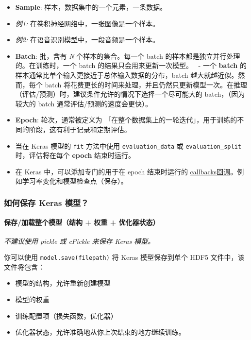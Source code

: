 \begin{itemize}
\tightlist
\item
  \textbf{Sample}: 样本，数据集中的一个元素，一条数据。
\item
  \emph{例1:} 在卷积神经网络中，一张图像是一个样本。
\item
  \emph{例2:} 在语音识别模型中，一段音频是一个样本。
\item
  \textbf{Batch}: 批，含有 \emph{N} 个样本的集合。每一个 batch
  的样本都是独立并行处理的。在训练时，一个 batch
  的结果只会用来更新一次模型。 ~- 一个 \textbf{batch}
  的样本通常比单个输入更接近于总体输入数据的分布，batch
  越大就越近似。然而，每个 batch
  将花费更长的时间来处理，并且仍然只更新模型一次。在推理（评估/预测）时，建议条件允许的情况下选择一个尽可能大的
  batch，（因为较大的 batch 通常评估/预测的速度会更快）。
\item
  \textbf{Epoch}: 轮次，通常被定义为
  「在整个数据集上的一轮迭代」，用于训练的不同的阶段，这有利于记录和定期评估。
\item
  当在 Keras 模型的 \texttt{fit} 方法中使用 \texttt{evaluation\_data} 或
  \texttt{evaluation\_split} 时，评估将在每个 \textbf{epoch}
  结束时运行。
\item
  在 Keras 中，可以添加专门的用于在 epoch 结束时运行的
  \hyperref[callbacks]{callbacks回调}。例如学习率变化和模型检查点（保存）。
\end{itemize}



\subsubsection{如何保存 Keras
模型？}\label{how-can-i-save-a-keras-model}

\paragraph{保存/加载整个模型（结构 + 权重 +
优化器状态）}\label{ux4fddux5b58ux52a0ux8f7dux6574ux4e2aux6a21ux578bux7ed3ux6784-ux6743ux91cd-ux4f18ux5316ux5668ux72b6ux6001}

\emph{不建议使用 pickle 或 cPickle 来保存 Keras 模型。}

你可以使用 \texttt{model.save(filepath)} 将 Keras 模型保存到单个 HDF5
文件中，该文件将包含：

\begin{itemize}
\tightlist
\item
  模型的结构，允许重新创建模型
\item
  模型的权重
\item
  训练配置项（损失函数，优化器）
\item
  优化器状态，允许准确地从你上次结束的地方继续训练。
\end{itemize}

